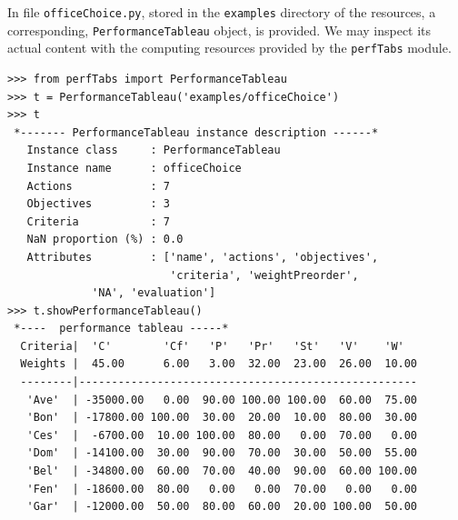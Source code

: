 In file \texttt{officeChoice.py}, stored in the \texttt{examples} directory of the \Digraph resources, a corresponding, \texttt{PerformanceTableau} object, is provided. We may inspect its actual content with the computing resources provided by the \texttt{perfTabs} module.
\begin{lstlisting}[caption={Inspecting the \texttt{officeChoice} performance tableau},label=list:6.1]
>>> from perfTabs import PerformanceTableau
>>> t = PerformanceTableau('examples/officeChoice')
>>> t
 *------- PerformanceTableau instance description ------*
   Instance class     : PerformanceTableau
   Instance name      : officeChoice
   Actions            : 7
   Objectives         : 3
   Criteria           : 7
   NaN proportion (%) : 0.0
   Attributes         : ['name', 'actions', 'objectives',
                         'criteria', 'weightPreorder',
			 'NA', 'evaluation']
>>> t.showPerformanceTableau()
 *----  performance tableau -----*
  Criteria|  'C'        'Cf'   'P'   'Pr'   'St'   'V'    'W'   
  Weights |  45.00      6.00   3.00  32.00  23.00  26.00  10.00    
  --------|----------------------------------------------------
   'Ave'  | -35000.00   0.00  90.00 100.00 100.00  60.00  75.00  
   'Bon'  | -17800.00 100.00  30.00  20.00  10.00  80.00  30.00  
   'Ces'  |  -6700.00  10.00 100.00  80.00   0.00  70.00   0.00  
   'Dom'  | -14100.00  30.00  90.00  70.00  30.00  50.00  55.00  
   'Bel'  | -34800.00  60.00  70.00  40.00  90.00  60.00 100.00  
   'Fen'  | -18600.00  80.00   0.00   0.00  70.00   0.00   0.00  
   'Gar'  | -12000.00  50.00  80.00  60.00  20.00 100.00  50.00  
\end{lstlisting}

